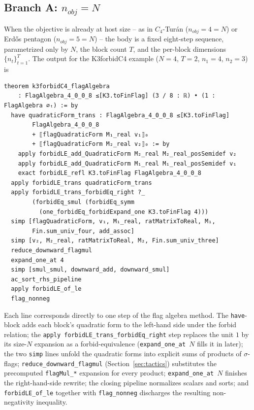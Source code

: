 \documentclass[11pt]{article}
\begin{document}
\subsection{Branch A: $n_{\mathit{obj}} = N$}

When the objective is already at host size -- as in $C_4$-Tur\'an
($n_{\mathit{obj}} = 4 = N$) or Erd\H{o}s pentagon
($n_{\mathit{obj}} = 5 = N$) -- the body is a fixed eight-step sequence,
parametrized only by $N$, the block count $T$, and the per-block
dimensions $\{n_t\}_{t=1}^{T}$. The output for the K3forbidC4 example
($N=4$, $T=2$, $n_1=4$, $n_2=3$) is

\begin{lstlisting}
theorem k3forbidC4_flagAlgebra
    : FlagAlgebra_4_0_0_8 ≤[K3.toFinFlag] (3 / 8 : ℝ) • (1 : FlagAlgebra ∅ₜ) := by
  have quadraticForm_trans : FlagAlgebra_4_0_0_8 ≤[K3.toFinFlag]
        FlagAlgebra_4_0_0_8
        + ⟦flagQuadraticForm M₁_real v₁⟧₀
        + ⟦flagQuadraticForm M₂_real v₂⟧₀ := by
    apply forbidLE_add_QuadraticForm M₂_real M₂_real_posSemidef v₂
    apply forbidLE_add_QuadraticForm M₁_real M₁_real_posSemidef v₁
    exact forbidLE_refl K3.toFinFlag FlagAlgebra_4_0_0_8
  apply forbidLE_trans quadraticForm_trans
  apply forbidLE_trans_forbidEq_right ?_
        (forbidEq_smul (forbidEq_symm
          (one_forbidEq_forbidExpand_one K3.toFinFlag 4)))
  simp [flagQuadraticForm, v₁, M₁_real, ratMatrixToReal, M₁,
        Fin.sum_univ_four, add_assoc]
  simp [v₂, M₂_real, ratMatrixToReal, M₂, Fin.sum_univ_three]
  reduce_downward_flagmul
  expand_one_at 4
  simp [smul_smul, downward_add, downward_smul]
  ac_sort_rhs_pipeline
  apply forbidLE_of_le
  flag_nonneg
\end{lstlisting}

Each line corresponds directly to one step of the flag algebra method.
The \texttt{have}-block adds each block's quadratic form to the
left-hand side under the forbid relation; the
\texttt{apply forbidLE\_trans\_forbidEq\_right} step replaces the unit
$1$ by its size-$N$ expansion as a forbid-equivalence
(\texttt{expand\_one\_at $N$} fills it in later); the two
\texttt{simp} lines unfold the quadratic forms into explicit sums of
products of $\sigma$-flags; \texttt{reduce\_downward\_flagmul}
(Section~\ref{sec:tactics}) substitutes the precomputed
\texttt{flagMul\_*} expansion for every product; \texttt{expand\_one\_at
$N$} finishes the right-hand-side rewrite; the closing pipeline
normalizes scalars and sorts; and \texttt{forbidLE\_of\_le} together
with \texttt{flag\_nonneg} discharges the resulting non-negativity
inequality.
\end{document}
